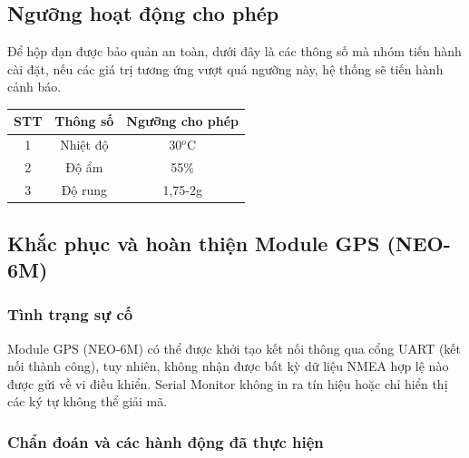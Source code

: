 \subsection{Ngưỡng hoạt động cho phép}
Để hộp đạn được bảo quản an toàn, dưới đây là các thông số mà nhóm tiến hành cài đặt, nếu các giá trị tương ứng vượt quá ngưỡng này, hệ thống sẽ tiến hành cảnh báo.

\begin{center}
\begin{tabular}{|c|c|c|}
    \hline
    \textbf{STT} & \textbf{Thông số} & \textbf{Ngưỡng cho phép} \\
    \hline
    1 & Nhiệt độ & 30$^o$C\\
    \hline
    2 & Độ ẩm & 55\%\\
    \hline
    3 & Độ rung & 1,75-2g\\
    \hline
\end{tabular}
\end{center}

\subsection{Khắc phục và hoàn thiện Module GPS (NEO-6M)}

\subsubsection{Tình trạng sự cố}
Module GPS (NEO-6M) có thể được khởi tạo kết nối thông qua cổng UART (kết nối thành công), 
tuy nhiên, không nhận được bất kỳ dữ liệu NMEA hợp lệ nào được gửi về vi điều khiển. 
Serial Monitor không in ra tín hiệu hoặc chỉ hiển thị các ký tự không thể giải mã.

\subsubsection{Chẩn đoán và các hành động đã thực hiện}

